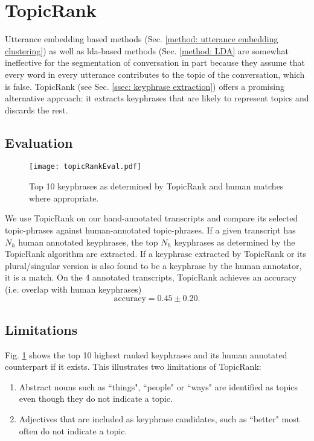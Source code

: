 \section{TopicRank \label{method: topic rank}}

Utterance \gls{embedding} based methods (Sec. \ref{method: utterance embedding clustering}) as well as \gls{lda}-based methods (Sec. \ref{method: LDA} are somewhat ineffective for the segmentation of conversation in part because they assume that every word in every \gls{utterance} contributes to the topic of the conversation, which is false.
TopicRank\cite{bougouin-etal-2013-topicrank} (see Sec. \ref{ssec: keyphrase extraction}) offers a promising alternative approach: it extracts \glspl{keyphrase} that are likely to represent topics and discards the rest.

\subsection{Evaluation}
\begin{figure}
    \centering
    \texttt{[image: topicRankEval.pdf]}
    \caption{Top 10 \glspl{keyphrase} as determined by TopicRank and human matches where appropriate.}
    \label{fig: topicrank eval}
\end{figure}
We use TopicRank on our hand-annotated transcripts and compare its selected topic-phrases against human-annotated topic-phrases. If a given transcript has $N_{h}$ human annotated \glspl{keyphrase}, the top $N_{h}$ \glspl{keyphrase} as determined by the TopicRank algorithm are extracted. If a \gls{keyphrase} extracted by TopicRank or its plural/singular version is also found to be a \gls{keyphrase} by the human annotator, it is a match. On the 4 annotated transcripts, TopicRank achieves an accuracy (i.e. overlap with human \glspl{keyphrase})
\begin{equation}
    \text{accuracy} = 0.45 \pm 0.20.
    \label{eq: topic rank accuracy}
\end{equation}

\subsection{Limitations}
Fig. \ref{fig: topicrank eval} shows the top 10 highest ranked \glspl{keyphrase} and its human annotated counterpart if it exists. This illustrates two limitations of TopicRank:
\begin{enumerate}
    \item Abstract nouns such as ``things", ``people" or ``ways" are identified as topics even though they do not indicate a topic.
    \item Adjectives that are included as \gls{keyphrase} candidates, such as ``better" most often do not indicate a topic.
\end{enumerate}

